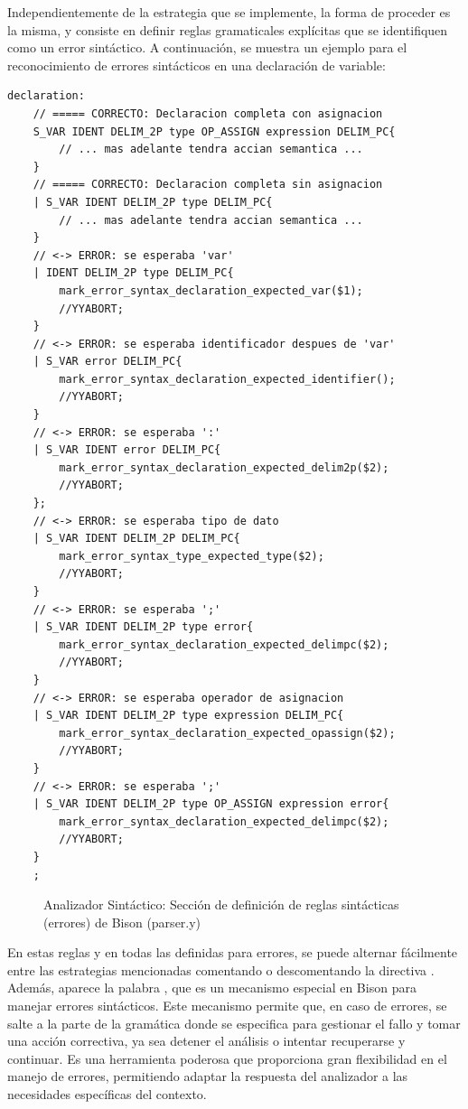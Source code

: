 \vspace{0.5cm}

Independientemente de la estrategia que se implemente, la forma de proceder es la misma, y consiste en definir reglas gramaticales explícitas que se identifiquen como un error sintáctico. A continuación, se muestra un ejemplo para el reconocimiento de errores sintácticos en una declaración de variable:

\begin{lstlisting}[style=customflex]
declaration:
    // ===== CORRECTO: Declaracion completa con asignacion
    S_VAR IDENT DELIM_2P type OP_ASSIGN expression DELIM_PC{
        // ... mas adelante tendra accian semantica ...
    }
    // ===== CORRECTO: Declaracion completa sin asignacion
    | S_VAR IDENT DELIM_2P type DELIM_PC{
        // ... mas adelante tendra accian semantica ...
    }
    // <-> ERROR: se esperaba 'var'
    | IDENT DELIM_2P type DELIM_PC{
        mark_error_syntax_declaration_expected_var($1);
        //YYABORT;
    }
    // <-> ERROR: se esperaba identificador despues de 'var'
    | S_VAR error DELIM_PC{
        mark_error_syntax_declaration_expected_identifier();
        //YYABORT;
    }
    // <-> ERROR: se esperaba ':'
    | S_VAR IDENT error DELIM_PC{
        mark_error_syntax_declaration_expected_delim2p($2);
        //YYABORT;
    };
    // <-> ERROR: se esperaba tipo de dato
    | S_VAR IDENT DELIM_2P DELIM_PC{
        mark_error_syntax_type_expected_type($2);
        //YYABORT;
    }
    // <-> ERROR: se esperaba ';'
    | S_VAR IDENT DELIM_2P type error{
        mark_error_syntax_declaration_expected_delimpc($2);
        //YYABORT;
    }
    // <-> ERROR: se esperaba operador de asignacion
    | S_VAR IDENT DELIM_2P type expression DELIM_PC{
        mark_error_syntax_declaration_expected_opassign($2);
        //YYABORT;
    }
    // <-> ERROR: se esperaba ';'
    | S_VAR IDENT DELIM_2P type OP_ASSIGN expression error{
        mark_error_syntax_declaration_expected_delimpc($2);
        //YYABORT;
    }
    ;

\end{lstlisting}
\begin{figure}[h]
\caption{Analizador Sintáctico: Sección de definición de reglas sintácticas (errores) de Bison (parser.y)}
\label{fig:bisonErrorDeclarations}
\end{figure}

En estas reglas y en todas las definidas para errores, se puede alternar fácilmente entre las estrategias mencionadas comentando o descomentando la directiva . Además, aparece la palabra , que es un mecanismo especial en Bison para manejar errores sintácticos. Este mecanismo permite que, en caso de errores, se salte a la parte de la gramática donde se especifica  para gestionar el fallo y tomar una acción correctiva, ya sea detener el análisis o intentar recuperarse y continuar. Es una herramienta poderosa que proporciona gran flexibilidad en el manejo de errores, permitiendo adaptar la respuesta del analizador a las necesidades específicas del contexto.

